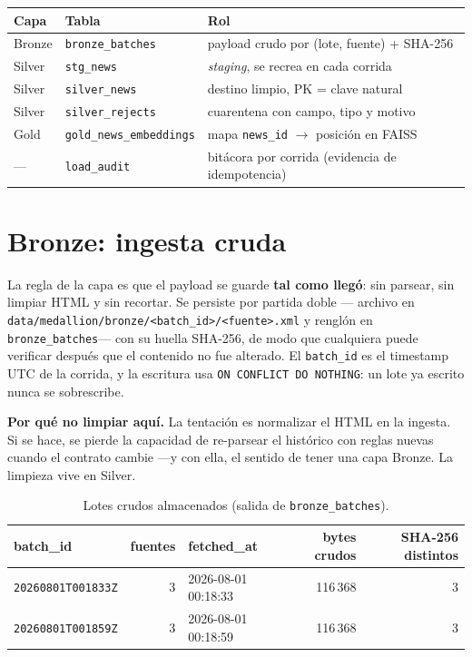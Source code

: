\documentclass[11pt,a4paper]{article}
\begin{document}
\begin{center}
\small
\begin{tabular}{@{}llp{7.6cm}@{}}
\toprule
\textbf{Capa} & \textbf{Tabla} & \textbf{Rol} \\
\midrule
Bronze & \texttt{bronze\_batches} & payload crudo por (lote, fuente) + SHA-256 \\
Silver & \texttt{stg\_news} & \emph{staging}, se recrea en cada corrida \\
Silver & \texttt{silver\_news} & destino limpio, PK = clave natural \\
Silver & \texttt{silver\_rejects} & cuarentena con campo, tipo y motivo \\
Gold & \texttt{gold\_news\_embeddings} & mapa \texttt{news\_id} $\rightarrow$ posición en FAISS \\
--- & \texttt{load\_audit} & bitácora por corrida (evidencia de idempotencia) \\
\bottomrule
\end{tabular}
\end{center}

\section{Bronze: ingesta cruda}

La regla de la capa es que el payload se guarde \textbf{tal como llegó}: sin
parsear, sin limpiar HTML y sin recortar. Se persiste por partida doble ---
archivo en \texttt{data/medallion/bronze/<batch\_id>/<fuente>.xml} y renglón en
\texttt{bronze\_batches}--- con su huella SHA-256, de modo que cualquiera puede
verificar después que el contenido no fue alterado. El \texttt{batch\_id} es el
timestamp UTC de la corrida, y la escritura usa \texttt{ON CONFLICT DO NOTHING}:
un lote ya escrito nunca se sobrescribe.

\begin{caja}
\textbf{Por qué no limpiar aquí.} La tentación es normalizar el HTML en la
ingesta. Si se hace, se pierde la capacidad de re-parsear el histórico con
reglas nuevas cuando el contrato cambie ---y con ella, el sentido de tener una
capa Bronze. La limpieza vive en Silver.
\end{caja}

\begin{table}[h]
\centering\small
\caption{Lotes crudos almacenados (salida de \texttt{bronze\_batches}).}
\begin{tabular}{@{}lrlrr@{}}
\toprule
\textbf{batch\_id} & \textbf{fuentes} & \textbf{fetched\_at} & \textbf{bytes crudos} & \textbf{SHA-256 distintos} \\
\midrule
\texttt{20260801T001833Z} & 3 & 2026-08-01 00:18:33 & 116\,368 & 3 \\
\texttt{20260801T001859Z} & 3 & 2026-08-01 00:18:59 & 116\,368 & 3 \\
\bottomrule
\end{tabular}
\end{table}
\end{document}
